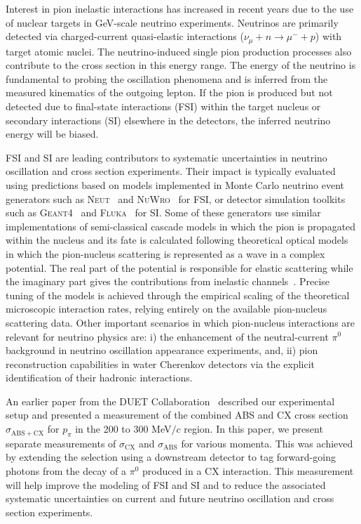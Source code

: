 Interest in pion inelastic interactions has increased in recent years due to the use of nuclear targets in GeV-scale neutrino experiments. Neutrinos are primarily detected via charged-current quasi-elastic interactions ($\nu_{\mu}+n\rightarrow \mu^{-} + p$) with target atomic nuclei. The neutrino-induced single pion production processes also contribute to the cross section in this energy range. The energy of the neutrino is fundamental to probing the oscillation phenomena and is inferred from the measured kinematics of the outgoing lepton. If the pion is produced but not detected due to final-state interactions (FSI) within the target nucleus or secondary interactions (SI) elsewhere in the detectors, the inferred neutrino energy will be biased. 

FSI and SI are leading contributors to systematic uncertainties in neutrino oscillation and cross section experiments. Their impact is typically evaluated using predictions based on models implemented in Monte Carlo neutrino event generators such as \textsc{Neut}~\cite{NEUT} and \textsc{NuWro}~\cite{NuWro} for FSI, or detector simulation toolkits such as \textsc{Geant4}~\cite{bertini} and \textsc{Fluka}~\cite{fluka1,fluka2} for SI. Some of these generators use similar implementations of semi-classical cascade models in which the pion is propagated within the nucleus and its fate is calculated following theoretical optical models in which the pion-nucleus scattering is represented as a wave in a complex potential. The real part of the potential is responsible for elastic scattering while the imaginary part gives the contributions from inelastic channels~\cite{Oset,Salcedo}. Precise tuning of the models is achieved through the empirical scaling of the theoretical microscopic interaction rates, relying entirely on the available pion-nucleus scattering data. Other important scenarios in which pion-nucleus interactions are relevant for neutrino physics are: i) the enhancement of the neutral-current $\pi^{0}$ background in neutrino oscillation appearance experiments, and, ii) pion reconstruction capabilities in water Cherenkov detectors via the explicit identification of their hadronic interactions.

An earlier paper from the DUET Collaboration~\cite{duet} described our experimental setup and presented a measurement of the combined ABS and CX cross section $\sigma_{\mathrm{ABS}+\mathrm{CX}}$ for $p_{\pi}$ in the 200 to 300 MeV$/c$ region. In this paper, we present separate measurements of $\sigma_{\mathrm{CX}}$ and $\sigma_{\mathrm{ABS}}$ for various momenta. This was achieved by extending the selection using a downstream detector to tag forward-going photons from the decay of a $\pi^0$ produced in a CX interaction. This measurement will help improve the modeling of FSI and SI and to reduce the associated systematic uncertainties on current and future neutrino oscillation and cross section experiments.